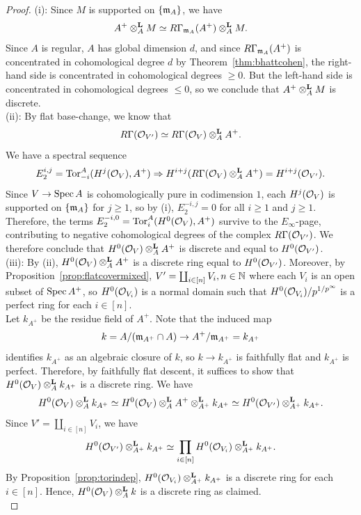 \begin{proof}
(i): Since $M$ is supported on $\{\ideal{m}_A\}$, we have
\[A^{+} \otimesl_A M \simeq R\Gamma_{\ideal{m}_A}(A^{+}) \otimesl_A M.\]
Since $A$ is regular, $A$ has global dimension $d$, and since $R\Gamma_{\ideal{m}_A}(A^{+})$ is concentrated in cohomological degree $d$ by Theorem~\ref{thm:bhattcohen}, 
the right-hand side is concentrated in cohomological degrees $\ge 0$. But the left-hand side is concentrated in cohomological degrees $\le 0$,
so we conclude that $A^{+} \otimesl_A M$ is discrete.\\
(ii): By flat base-change, we know that
\[R\Gamma(\cal{O}_{V'}) \simeq R\Gamma(\cal{O}_V) \otimesl_A A^{+}.\]
We have a spectral sequence 
\[E_2^{i,j} = \mathrm{Tor}_{-i}^A(H^j(\cal{O}_V), A^{+}) \Rightarrow H^{i+j}(R\Gamma(\cal{O}_V) \otimesl_A A^{+}) = H^{i+j}(\cal{O}_{V'}).\]
Since $V \to \spec{A}$ is cohomologically pure in codimension $1$, each $H^j(\cal{O}_V)$ is supported on $\{\ideal{m}_A\}$ for $j \ge 1$, so by (i), $E_2^{-i,j} = 0$ for all $i \ge 1$ and $j \ge 1$.
Therefore, the terms $E_2^{-i,0} = \Tor_{i}^A(H^0(\cal{O}_V), A^{+})$ survive to the $E_{\infty}$-page, contributing to negative cohomological degrees of the complex $R\Gamma(\cal{O}_{V'})$.
We therefore conclude that $H^0(\cal{O}_V) \otimesl_A A^{+}$ is discrete and equal to $H^0(\cal{O}_{V'})$.\\
(iii): By (ii), $H^0(\cal{O}_{V}) \otimesl_A A^{+}$ is a discrete ring equal to $H^0(\cal{O}_{V'})$. Moreover,
by Proposition~\ref{prop:flatcovermixed}, $V'=\coprod_{i \in [n]} V_i, n \in \bb{N}$ where each $V_i$ is an open subset of $\spec{A^{+}}$,
so $H^0(\cal{O}_{V_i})$ is a normal domain such that $H^0(\cal{O}_{V_i})/p^{1/p^{\infty}}$ is a perfect ring for each $i \in [n]$.\\
\indent Let $k_{A^{+}}$ be the residue field of $A^{+}$. Note that the induced map 
\[k=A/(\ideal{m}_{A^{+}} \cap A) \to A^{+}/\ideal{m}_{A^{+}}=k_{A^{+}}\]
identifies $k_{A^{+}}$ as an algebraic closure of $k$, so $k \to k_{A^{+}}$ is faithfully flat and $k_{A^{+}}$ is perfect. 
Therefore, by faithfully flat descent, it suffices to show that $H^0(\cal{O}_V) \otimesl_A k_{A^{+}}$ is a discrete ring. We have
\[H^0(\cal{O}_V) \otimesl_A k_{A^{+}} \simeq H^0(\cal{O}_V) \otimesl_A A^{+} \otimesl_{A^{+}} k_{A^{+}} \simeq H^0(\cal{O}_{V'}) \otimesl_{A^{+}} k_{A^{+}}.\]
Since $V'=\coprod_{i \in [n]} V_i$, we have
\[H^0(\cal{O}_{V'}) \otimesl_{A^{+}} k_{A^{+}} \simeq \prod_{i \in [n]} H^0(\cal{O}_{V_i}) \otimesl_{A^{+}} k_{A^{+}}.\]
By Proposition~\ref{prop:torindep}, $H^0(\cal{O}_{V_i}) \otimesl_{A^{+}} k_{A^{+}}$ 
is a discrete ring for each $i \in [n]$. Hence, $H^0(\cal{O}_V) \otimesl_A k$ is a discrete ring as claimed.\\
\end{proof}
